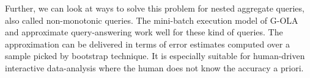 Further, we can look at ways to solve this problem for nested aggregate queries, also called non-monotonic queries. The mini-batch execution model of G-OLA\cite{G-OLA} and approximate query-answering\cite{ApproximateQueryAnsweringSystem} work well for these kind of queries. The approximation can be delivered in terms of error estimates\cite{ErrorEstimation} computed over a sample picked by bootstrap technique. It is especially suitable for human-driven interactive data-analysis where the human does not know the accuracy a priori.